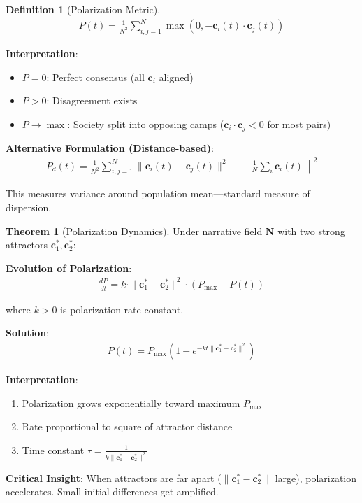 \documentclass[11pt,a4paper]{article}
\theoremstyle{definition}
\newtheorem{definition}{Definition}[section]
\newtheorem{theorem}{Theorem}[section]
\theoremstyle{remark}
\newcommand{\cc}{\mathbf{c}}
\begin{document}
\begin{small}
\begin{enumerate}
\begin{definition}[Polarization Metric]
\begin{align}
P(t) = \frac{1}{N^2} \sum_{i,j=1}^N \max(0, -\cc_i(t) \cdot \cc_j(t))
\end{align}

\textbf{Interpretation}:
\begin{itemize}
    \item \(P = 0\): Perfect consensus (all \(\cc_i\) aligned)
    \item \(P > 0\): Disagreement exists
    \item \(P \to \max\): Society split into opposing camps (\(\cc_i \cdot \cc_j < 0\) for most pairs)
\end{itemize}

\textbf{Alternative Formulation (Distance-based)}:
\begin{align}
P_d(t) = \frac{1}{N^2} \sum_{i,j=1}^N \|\cc_i(t) - \cc_j(t)\|^2 - \left\|\frac{1}{N}\sum_i \cc_i(t)\right\|^2
\end{align}

This measures variance around population mean—standard measure of dispersion.
\end{definition}

\begin{theorem}[Polarization Dynamics]
Under narrative field \(\mathbf{N}\) with two strong attractors \(\cc^*_1, \cc^*_2\):

\textbf{Evolution of Polarization}:
\begin{align}
\frac{dP}{dt} = k \cdot \|\cc^*_1 - \cc^*_2\|^2 \cdot (P_{\max} - P(t))
\end{align}

where \(k > 0\) is polarization rate constant.

\textbf{Solution}:
\begin{align}
P(t) = P_{\max} \left(1 - e^{-kt \|\cc^*_1 - \cc^*_2\|^2}\right)
\end{align}

\textbf{Interpretation}: 
\begin{enumerate}
    \item Polarization grows exponentially toward maximum \(P_{\max}\)
    \item Rate proportional to square of attractor distance
    \item Time constant \(\tau = \frac{1}{k \|\cc^*_1 - \cc^*_2\|^2}\)
\end{enumerate}

\textbf{Critical Insight}: When attractors are far apart (\(\|\cc^*_1 - \cc^*_2\|\) large), polarization accelerates. Small initial differences get amplified.
\end{theorem}


\end{enumerate}
\end{small}
\end{document}
